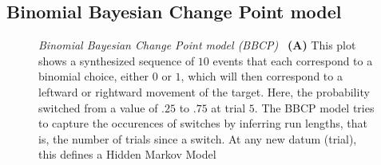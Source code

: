 \documentclass[12pt,english]{article}%
\newcommand{\seeFig}[1]{Figure~\ref{fig:#1}}
\begin{document}
\subsection{Binomial Bayesian Change Point model}
\begin{figure}%
\caption{\emph{Binomial Bayesian Change Point model (BBCP)}
~\textbf{(A)} This plot shows a synthesized sequence of $10$ events
that each correspond to a binomial choice, either $0$ or $1$,
which will then correspond to a leftward or rightward movement of the target.
Here, the probability switched from a value of $.25$ to $.75$ at trial $5$.
The BBCP model tries to capture the occurences of switches by inferring run lengths,
that is, the number of trials since a switch.
At any new datum (trial), this defines a Hidden Markov Model
}
\end{figure}
\end{document}
